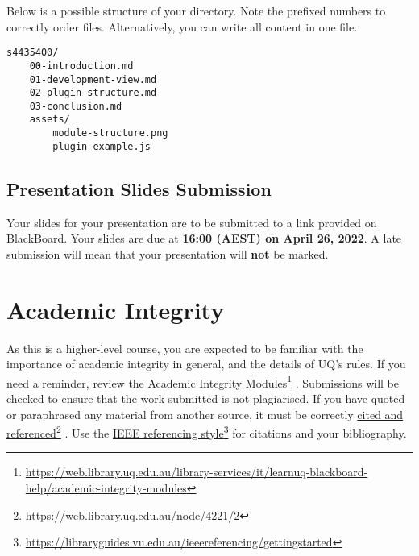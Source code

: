 \documentclass{csse4400}
\newcommand{\link}[2]{%
\href{#2}{#1}\footnote{\url{#2}}%
}
\begin{document}
\noindent
Below is a possible structure of your directory. Note the prefixed numbers to correctly order files.
Alternatively, you can write all content in one file.

\begin{verbatim}
s4435400/
    00-introduction.md
    01-development-view.md
    02-plugin-structure.md
    03-conclusion.md
    assets/
        module-structure.png
        plugin-example.js
\end{verbatim}

\subsection{Presentation Slides Submission}
Your slides for your presentation are to be submitted to a link provided on BlackBoard.
Your slides are due at \textbf{16:00 (AEST) on April 26, 2022}. A late submission will mean that your presentation will \textbf{not} be marked.


\section{Academic Integrity}
As this is a higher-level course, you are expected to be familiar with the importance of academic integrity in general, and the details of UQ's rules.
If you need a reminder, review the \link{Academic Integrity Modules}{https://web.library.uq.edu.au/library-services/it/learnuq-blackboard-help/academic-integrity-modules}.
Submissions will be checked to ensure that the work submitted is not plagiarised.
If you have quoted or paraphrased any material from another source, it must be correctly \link{cited and referenced}{https://web.library.uq.edu.au/node/4221/2}.
Use the \link{IEEE referencing style}{https://libraryguides.vu.edu.au/ieeereferencing/gettingstarted} for citations and your bibliography.



\end{document}
